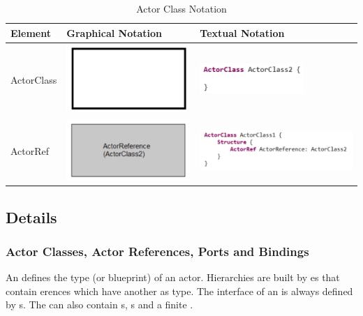 \begin{table}
\caption{Actor Class Notation}
\begin{tabular}{|l|l|l|}
\hline
 \textbf{Element} & \textbf{Graphical Notation} & \textbf{Textual Notation} \\ \hline
  ActorClass & \includegraphics[scale=0.7]{images/040-ActorClassNotation.png} & 
\includegraphics[scale=0.7]{images/040-ActorClassTextualNotation.png} \\ \hline
  ActorRef & \includegraphics[scale=0.7]{images/040-ActorReferenceNotation.png} & 
\includegraphics[scale=0.7]{images/040-ActorReferenceTextualNotation.png} \\ \hline
\end{tabular}
\end{table}


\subsection{Details}

\subsubsection{Actor Classes, Actor References, Ports and Bindings}

An  defines the type (or blueprint) of an actor. Hierarchies are built by es
that contain erences which have another  as type. The interface of an 
 is always defined by s. The  can also contain
s, s
and a finite . 

